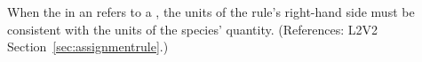 When the  in an \AssignmentRule refers to a \Species, the
units of the rule's right-hand side must be consistent with the units of
the species' quantity.  (References: L2V2
Section~\ref{sec:assignmentrule}.)
